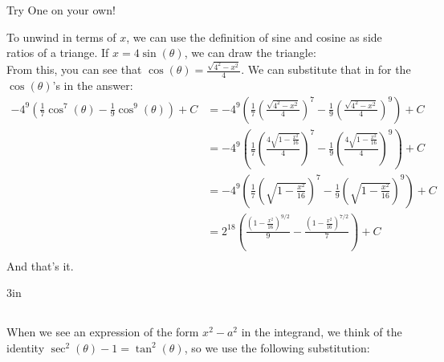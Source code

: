 \begin{exercise}{
Try One on your own! \Coffeecup \Coffeecup \Coffeecup}
{\begin{figure}
\end{figure}
To unwind in terms of $x$, we can use the definition of sine and cosine as side ratios of a triange. If $x=4\sin(\theta)$, we can draw the triangle:\\
From this, you can see that $\cos(\theta)=\frac{\sqrt{4^2-x^2}}{4}$. We can substitute that in for the $\cos(\theta)$'s in the answer:
\begin{align*}
-4^9\left(\frac{1}{7}\cos^7(\theta)-\frac{1}{9}\cos^9(\theta)\right)+C&=-4^9\left(\frac{1}{7}\left(\frac{\sqrt{4^2-x^2}}{4}\right)^7-\frac{1}{9}\left(\frac{\sqrt{4^2-x^2}}{4}\right)^9\right)+C\\
&=-4^9\left(\frac{1}{7}\left(\frac{4\sqrt{1-\frac{x^2}{16}}}{4}\right)^7-\frac{1}{9}\left(\frac{4\sqrt{1-\frac{x^2}{16}}}{4}\right)^9\right)+C\\
&=-4^9\left(\frac{1}{7}\left(\sqrt{1-\frac{x^2}{16}}\right)^7-\frac{1}{9}\left(\sqrt{1-\frac{x^2}{16}}\right)^9\right)+C\\
&=2^{18}\left(\frac{\left(1-\frac{x^2}{16}\right)^{9/2}}{9}-\frac{\left(1-\frac{x^2}{16}\right)^{7/2}}{7}\right)+C\\
\end{align*}
And that's it.
}{3in}
\end{exercise} 

\subsection{}\label{secantsub} When we see an expression of the form $x^2-a^2$ in the integrand, we think of the identity $\sec^2(\theta)-1=\tan^2(\theta)$, so we use the following substitution:

    
